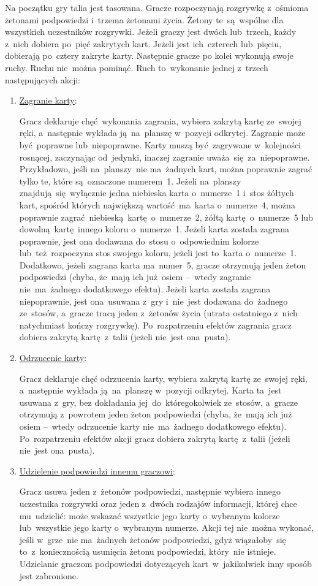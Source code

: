 \documentclass[declaration,shortabstract,inz]{iithesis}
\begin{document}
Na początku gry talia jest tasowana. Gracze rozpoczynają rozgrywkę z~ośmioma żetonami podpowiedzi i~trzema żetonami życia. Żetony te~są~wspólne dla wszystkich uczestników rozgrywki. Jeżeli graczy jest dwóch lub~trzech, każdy z~nich dobiera po~pięć zakrytych kart. Jeżeli jest ich~czterech lub~pięciu, dobierają po~cztery zakryte karty. Następnie gracze po kolei wykonują swoje ruchy. Ruchu nie~można pominąć. Ruch to~wykonanie jednej z~trzech następujących akcji:
\begin{enumerate}
	\item \underline{Zagranie karty}:

	Gracz deklaruje chęć wykonania zagrania, wybiera zakrytą kartę ze~swojej ręki, a~następnie wykłada ją~na~planszę w~pozycji odkrytej. Zagranie może być~poprawne lub~niepoprawne. Karty muszą być~zagrywane w~kolejności rosnącej, zaczynając od~jedynki, inaczej zagranie uważa~się za~niepoprawne. Przykładowo, jeśli na~planszy~nie ma~żadnych kart, można poprawnie zagrać tylko te, które są~oznaczone numerem~1. Jeżeli na~planszy znajdują~się wyłącznie jedna niebieska karta o~numerze~1 i~stos żółtych kart, spośród których największą wartość ma~karta o~numerze~4, można poprawnie zagrać niebieską kartę o~numerze~2, żółtą kartę o~numerze~5 lub dowolną kartę innego koloru o~numerze~1. Jeżeli karta została zagrana poprawnie, jest ona dodawana do~stosu o~odpowiednim kolorze lub~też~rozpoczyna stos swojego koloru, jeżeli jest to~karta o~numerze~1. Dodatkowo, jeżeli zagrana karta ma~numer~5, gracze otrzymują jeden żeton podpowiedzi (chyba, że~mają ich już osiem --~wtedy zagranie nie~ma~żadnego dodatkowego efektu). Jeżeli karta została zagrana niepoprawnie, jest ona~usuwana z~gry i~nie~jest dodawana do~żadnego ze~stosów, a~gracze tracą jeden z~żetonów życia (utrata ostatniego z~nich natychmiast kończy rozgrywkę). Po~rozpatrzeniu efektów zagrania gracz dobiera zakrytą kartę z~talii (jeżeli nie~jest ona~pusta).
	
	\item \underline{Odrzucenie karty}:
 
	Gracz deklaruje chęć odrzucenia karty, wybiera zakrytą kartę ze~swojej ręki, a~następnie wykłada ją~na~planszę w~pozycji odkrytej. Karta ta~jest usuwana z~gry, bez dokładania jej~do~któregokolwiek ze~stosów, a~gracze otrzymują z~powrotem jeden żeton podpowiedzi (chyba, że~mają ich już osiem --~wtedy odrzucenie karty nie~ma~żadnego dodatkowego efektu). Po~rozpatrzeniu efektów akcji gracz dobiera zakrytą kartę z~talii (jeżeli nie~jest ona~pusta).

	\item \underline{Udzielenie podpowiedzi innemu graczowi}:

	Gracz usuwa jeden z~żetonów podpowiedzi, następnie wybiera innego uczestnika rozgrywki oraz jeden z~dwóch rodzajów informacji, której chce mu~udzielić: może wskazać wszystkie jego karty o~wybranym kolorze lub~wszystkie jego karty o~wybranym numerze. Akcji tej nie~można wykonać, jeśli w~grze~nie ma~żadnych żetonów podpowiedzi, gdyż wiązałoby~się to~z~koniecznością usunięcia żetonu podpowiedzi, który~nie istnieje. Udzielanie graczom podpowiedzi dotyczących kart w~jakikolwiek inny sposób jest zabronione.
\end{enumerate}
\end{document}

